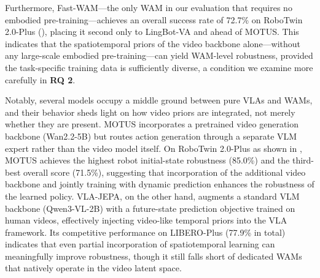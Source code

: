 \documentclass{article}
\begin{document}
Furthermore, Fast-WAM---the only WAM in our evaluation that requires no embodied pre-training---achieves an overall success rate of 72.7\% on RoboTwin 2.0-Plus (), placing it second only to LingBot-VA and ahead of MOTUS. This indicates that the spatiotemporal priors of the video backbone alone---without any large-scale embodied pre-training---can yield WAM-level robustness, provided the task-specific training data is sufficiently diverse, a condition we examine more carefully in \textbf{RQ 2}.

Notably, several models occupy a middle ground between pure VLAs and WAMs, and their behavior sheds light on how video priors are integrated, not merely whether they are present. MOTUS incorporates a pretrained video generation backbone (Wan2.2-5B) but routes action generation through a separate VLM expert rather than the video model itself. On RoboTwin 2.0-Plus as shown in , MOTUS achieves the highest robot initial-state robustness (85.0\%) and the third-best overall score (71.5\%), suggesting that incorporation of the additional video backbone and jointly training with dynamic prediction enhances the robustness of the learned policy. VLA-JEPA, on the other hand, augments a standard VLM backbone (Qwen3-VL-2B) with a future-state prediction objective trained on human videos, effectively injecting video-like temporal priors into the VLA framework. Its competitive performance on LIBERO-Plus (77.9\% in total) indicates that even partial incorporation of spatiotemporal learning can meaningfully improve robustness, though it still falls short of dedicated WAMs that natively operate in the video latent space.




\end{document}
